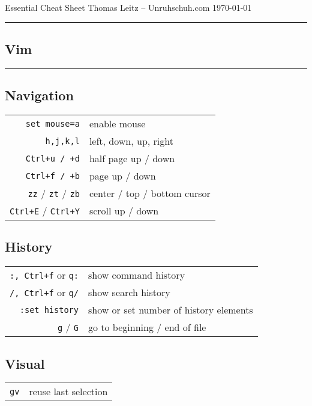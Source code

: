 

\author{Thomas Leitz (Unruhschuh.com)}
\date{\today}



\raggedcolumns

Essential Cheat Sheet\hfill
Thomas Leitz -- Unruhschuh.com\hfill
\today
\hrule
\vspace*{2pt}

\begin{multicols*}{3}
  

\centering

\section*{Vim}
\hrule\vspace*{2pt}
\subsection*{Navigation}
\begin{tabular}{@{}rl@{}}
\verb|set mouse=a| & enable mouse \\
\verb|h,j,k,l|     & left, down, up, right \\
\verb|Ctrl+u / +d| & half page up / down \\
\verb|Ctrl+f / +b| & page up / down \\
\verb|zz| / \verb|zt| / \verb|zb| & center / top / bottom cursor \\
\verb|Ctrl+E| / \verb|Ctrl+Y| & scroll up / down
\end{tabular}

\subsection*{History}
\begin{tabular}{@{}rl@{}}
\verb|:, Ctrl+f| or \verb|q:| & show command history \\
\verb|/, Ctrl+f| or \verb|q/| & show search history \\
\verb|:set history| & show or set number of history elements \\
\verb|g| / \verb|G| & go to beginning / end of file
\end{tabular}

\subsection*{Visual}
\begin{tabular}{@{}rl@{}}
\verb|gv| & reuse last selection
\end{tabular}


\end{multicols*}
